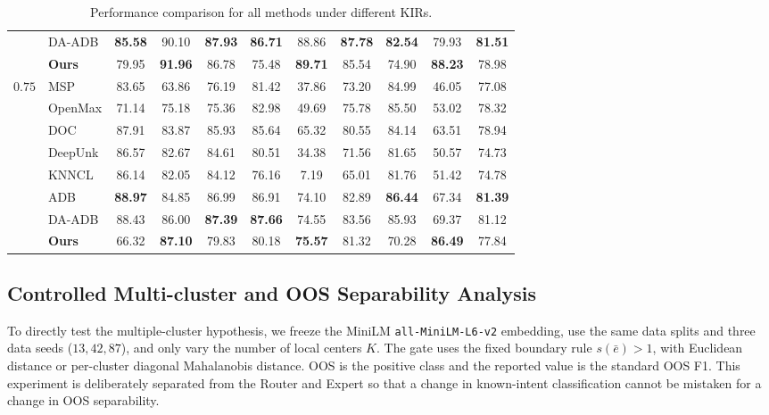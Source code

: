 \documentclass[11pt]{article}
\begin{document}
\begin{table}[!t]
{\begin{tabular}{c|l|ccc|ccc|ccc}
& DA-ADB   & \textbf{85.58} & 90.10 & \textbf{87.93} & \textbf{86.71} & 88.86 & \textbf{87.78} & \textbf{82.54} & 79.93 & \textbf{81.51} \\
& \textbf{Ours} & 79.95 & \textbf{91.96} & 86.78 & 75.48 & \textbf{89.71} & 85.54 & 74.90 & \textbf{88.23} & 78.98 \\
\midrule
\multirow{8}{*}{$0.75$}
& MSP      & 83.65 & 63.86 & 76.19 & 81.42 & 37.86 & 73.20 & 84.99 & 46.05 & 77.08 \\
& OpenMax  & 71.14 & 75.18 & 75.36 & 82.98 & 49.69 & 75.78 & 85.50 & 53.02 & 78.32 \\
& DOC      & 87.91 & 83.87 & 85.93 & 85.64 & 65.32 & 80.55 & 84.14 & 63.51 & 78.94 \\
& DeepUnk  & 86.57 & 82.67 & 84.61 & 80.51 & 34.38 & 71.56 & 81.65 & 50.57 & 74.73 \\
& KNNCL    & 86.14 & 82.05 & 84.12 & 76.16 & 7.19 & 65.01 & 81.76 & 51.42 & 74.78 \\
& ADB      & \textbf{88.97} & 84.85 & 86.99 & 86.91 & 74.10 & 82.89 & \textbf{86.44} & 67.34 & \textbf{81.39} \\
& DA-ADB   & 88.43 & 86.00 & \textbf{87.39} & \textbf{87.66} & 74.55 & 83.56 & 85.93 & 69.37 & 81.12 \\
& \textbf{Ours} & 66.32 & \textbf{87.10} & 79.83 & 80.18 & \textbf{75.57} & 81.32 & 70.28 & \textbf{86.49} & 77.84 \\
\bottomrule
\end{tabular}
}
\caption{Performance comparison for all methods under different KIRs.}
\label{tab:main_results_all}
\end{table}

\subsection{Controlled Multi-cluster and OOS Separability Analysis}

To directly test the multiple-cluster hypothesis, we freeze the MiniLM
\texttt{all-MiniLM-L6-v2} embedding, use the same data splits and three data
seeds ($13,42,87$), and only vary the number of local centers $K$. The gate
uses the fixed boundary rule $s(\bar e)>1$, with Euclidean distance or
per-cluster diagonal Mahalanobis distance. OOS is the positive class and the
reported value is the standard OOS F1. This experiment is deliberately
separated from the Router and Expert so that a change in known-intent
classification cannot be mistaken for a change in OOS separability.
\end{document}
